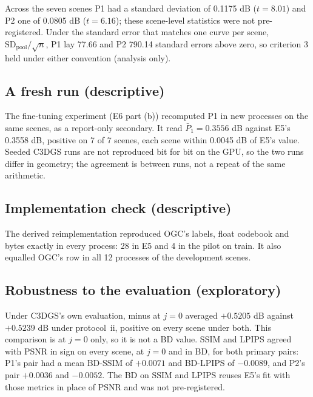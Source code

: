Across the seven scenes P1 had a standard deviation of 0.1175 dB ($t = 8.01$) and P2 one of 0.0805 dB ($t = 6.16$); these scene-level statistics were not pre-registered. %
Under the standard error that matches one curve per scene, $\mathrm{SD}_{\mathrm{pool}}/\sqrt{n}$, P1 lay 77.66 and P2 790.14 standard errors above zero, so criterion 3 held under either convention (analysis only). %

\subsection{A fresh run (descriptive)}

The fine-tuning experiment (E6 part (b)) recomputed P1 in new processes on the same scenes, as a report-only secondary. %
It read $\bar P_1 = 0.3556$ dB against E5's 0.3558 dB, positive on 7 of 7 scenes, each scene within 0.0045 dB of E5's value. %
Seeded C3DGS runs are not reproduced bit for bit on the GPU, so the two runs differ in geometry; the agreement is between runs, not a repeat of the same arithmetic. %

\subsection{Implementation check (descriptive)}

The derived reimplementation  reproduced OGC's labels, float codebook and  bytes exactly in every process: 28 in E5 and 4 in the pilot on train. %
It also equalled OGC's row in all 12 processes of the development scenes. %

\subsection{Robustness to the evaluation (exploratory)}

Under C3DGS's own evaluation,  minus  at $j = 0$ averaged $+0.5205$ dB against $+0.5239$ dB under protocol~ii, positive on every scene under both. %
This comparison is at $j = 0$ only, so it is not a BD value. %
SSIM and LPIPS agreed with PSNR in sign on every scene, at $j = 0$ and in BD, for both primary pairs: P1's pair had a mean BD-SSIM of $+0.0071$ and BD-LPIPS of $-0.0089$, and P2's pair $+0.0036$ and $-0.0052$. %
The BD on SSIM and LPIPS reuses E5's fit with those metrics in place of PSNR and was not pre-registered. %

